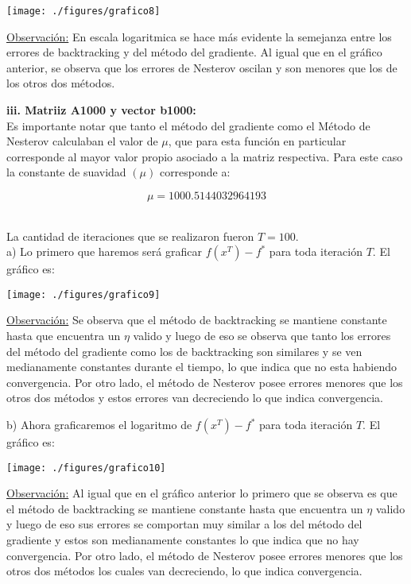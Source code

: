 \documentclass[11pt]{article}
\begin{document}
\begin{center}
\texttt{[image: ./figures/grafico8]}
\end{center}

\underline{Observación:} En escala logaritmica se hace más evidente la semejanza entre los errores de backtracking y del método del gradiente. Al igual que en el gráfico anterior, se observa que los errores de Nesterov oscilan y son menores que los de los otros dos métodos. \\

\newpage

\textbf{iii. Matriiz A1000 y vector b1000:} \\

Es importante notar que tanto el método del gradiente como el Método de Nesterov calculaban el valor de $\mu$, que para esta función en particular corresponde al mayor valor propio asociado a la matriz respectiva. Para este caso la constante de suavidad $(\mu)$ corresponde a:

\[ \mu = 1000.5144032964193 \] \

La cantidad de iteraciones que se realizaron fueron $T=100$. \\

a) Lo primero que haremos será graficar $ f(x^T) - f^{*}$ para toda iteración $T$. El gráfico es:

\begin{center}
\texttt{[image: ./figures/grafico9]}
\end{center}

\underline{Observación:} Se observa que el método de backtracking se mantiene constante hasta que encuentra un $\eta$ valido y luego de eso se observa que tanto los errores del método del gradiente como los de backtracking son similares y se ven medianamente constantes durante el tiempo, lo que indica que no esta habiendo convergencia. Por otro lado, el método de Nesterov posee errores menores que los otros dos métodos y estos errores van decreciendo lo que indica convergencia.  \\

\newpage

b) Ahora graficaremos el logaritmo de $ f(x^T) - f^{*}$ para toda iteración $T$. El gráfico es:

\begin{center}
\texttt{[image: ./figures/grafico10]}
\end{center}

\underline{Observación:} Al igual que en el gráfico anterior lo primero que se observa es que el método de backtracking se mantiene constante hasta que encuentra un $\eta$ valido y luego de eso sus errores se comportan muy similar a los del método del gradiente y estos son medianamente constantes lo que indica que no hay convergencia. Por otro lado, el método de Nesterov posee errores menores que los otros dos métodos los cuales van decreciendo, lo que indica convergencia. \\
\end{document}
